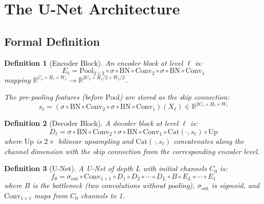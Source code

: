 \documentclass[10pt,twocolumn]{article}
\newtheorem{definition}{Definition}[section]
\begin{document}
\section{The U-Net Architecture}

\subsection{Formal Definition}

\begin{definition}[Encoder Block]\label{def:enc}
An encoder block at level $\ell$ is:
\begin{equation}
E_\ell = \text{Pool}_{2\times2} \circ \sigma \circ \text{BN} \circ \text{Conv}_2 \circ \sigma \circ \text{BN} \circ \text{Conv}_1
\end{equation}
mapping $\mathbb{R}^{C_\ell \times H_\ell \times W_\ell} \to \mathbb{R}^{2C_\ell \times H_\ell/2 \times W_\ell/2}$.

The \emph{pre-pooling} features (before $\text{Pool}$) are stored as the skip connection:
\begin{equation}
s_\ell = (\sigma \circ \text{BN} \circ \text{Conv}_2 \circ \sigma \circ \text{BN} \circ \text{Conv}_1)(X_\ell) \in \mathbb{R}^{2C_\ell \times H_\ell \times W_\ell}
\end{equation}
\end{definition}

\begin{definition}[Decoder Block]\label{def:dec}
A decoder block at level $\ell$ is:
\begin{equation}
D_\ell = \sigma \circ \text{BN} \circ \text{Conv}_2 \circ \sigma \circ \text{BN} \circ \text{Conv}_1 \circ \text{Cat}(\cdot, s_\ell) \circ \text{Up}
\end{equation}
where $\text{Up}$ is $2\times$ bilinear upsampling and $\text{Cat}(\cdot, s_\ell)$ concatenates along the channel dimension with the skip connection from the corresponding encoder level.
\end{definition}

\begin{definition}[U-Net]\label{def:unet}
A U-Net of depth $L$ with initial channels $C_0$ is:
\begin{equation}
f_\theta = \sigma_{\text{out}} \circ \text{Conv}_{1\times1} \circ D_1 \circ D_2 \circ \cdots \circ D_L \circ B \circ E_L \circ \cdots \circ E_1
\end{equation}
where $B$ is the bottleneck (two convolutions without pooling), $\sigma_{\text{out}}$ is sigmoid, and $\text{Conv}_{1\times1}$ maps from $C_0$ channels to 1.
\end{definition}
\end{document}
